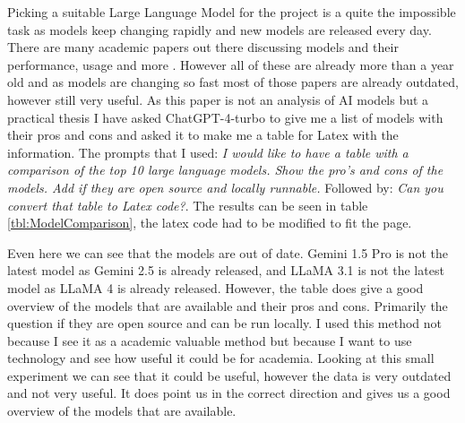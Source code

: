 Picking a suitable Large Language Model for the project is a quite the impossible task as models keep changing rapidly and new models are released every day. There are many academic papers out there discussing models and their performance, usage and more \cite{2024arXiv240201687A,chang2024survey,hadi2023survey,zhao2023survey}. However all of these are already more than a year old and as models are changing so fast most of those papers are already outdated, however still very useful. As this paper is not an analysis of AI models but a practical thesis I have asked ChatGPT-4-turbo to give me a list of models with their pros and cons and asked it to make me a table for Latex with the information. The prompts that I used: \textit{I would like to have a table with a comparison of the top 10 large language models. Show the pro's and cons of the models. Add if they are open source and locally runnable.} Followed by: \textit{Can you convert that table to Latex code?}. The results can be seen in table \ref{tbl:ModelComparison}, the latex code had to be modified to fit the page.

Even here we can see that the models are out of date. Gemini 1.5 Pro is not the latest model as Gemini 2.5 is already released, and LLaMA 3.1 is not the latest model as LLaMA 4 is already released. However, the table does give a good overview of the models that are available and their pros and cons. Primarily the question if they are open source and can be run locally. I used this method not because I see it as a academic valuable method but because I want to use technology and see how useful it could be for academia. Looking at this small experiment we can see that it could be useful, however the data is very outdated and not very useful. It does point us in the correct direction and gives us a good overview of the models that are available.

